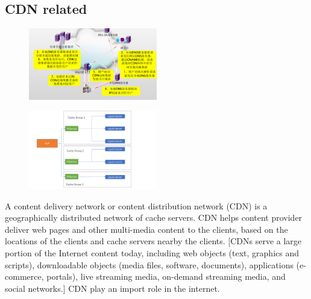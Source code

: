 \documentclass[review]{elsarticle}
\begin{document}
\subsection{CDN related}
\begin{figure}[h]
    \centering
    \includegraphics[width=0.5\textwidth]{CDN.png}
    \caption{}
    \label{fig:CDN}
\end{figure}
\begin{figure}[h]
    \centering
    \includegraphics[width=0.5\textwidth]{Cache_group.png}
    \caption{}
    \label{fig:CDN}
\end{figure}
A content delivery network or content distribution network (CDN) is a geographically distributed network of cache servers. CDN helps content provider deliver web pages and other multi-media content to the clients, based on the locations of the clients and cache servers nearby the clients. [CDNs serve a large portion of the Internet content today, including web objects (text, graphics and scripts), downloadable objects (media files, software, documents), applications (e-commerce, portals), live streaming media, on-demand streaming media, and social networks.] CDN play an import role in the internet.
\end{document}
